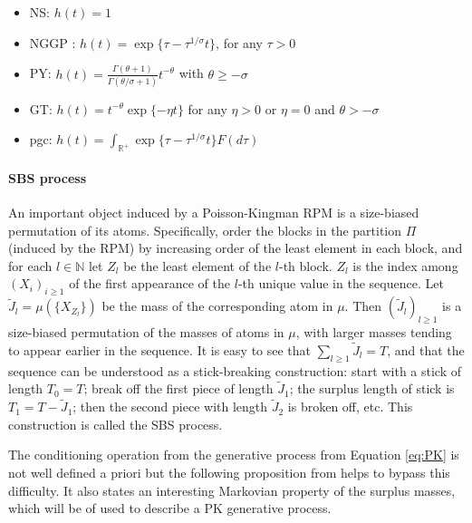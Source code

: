 \begin{itemize}
\item \acrfull{NS}: $h(t) = 1$
\item \acrfull{NGGP} : $h(t) = \exp\{\tau - \tau^{1/\sigma}t \}$, for any $\tau > 0$
\item \acrfull{PY}: $h(t) = \frac{\Gamma(\theta + 1)}{\Gamma(\theta / \sigma + 1)}t^{-\theta}$ with $\theta \ge -\sigma$
\item \acrfull{GT}: $h(t) = t^{-\theta} \exp\{-\eta t\}$ for any $\eta > 0$ or $\eta=0$ and $\theta>-\sigma$
\item \acrfull{pgc}: $h(t) = \int_{\mathbb{R}^+} \exp\{\tau - \tau^{1/\sigma}t \} F(d\tau)$ \\
\end{itemize}

\paragraph{\acrlong{SBS} process} \label{SBS}
An important object induced by a Poisson-Kingman \gls{RPM} is a size-biased permutation of its atoms. Specifically, order the blocks in the partition $\Pi$ (induced by the \gls{RPM}) by increasing order of the least element in each block, and for each $l \in \mathbb{N}$ let $Z_l$ be the least element of the $l$-th block. $Z_l$ is the index among $(X_i)_{i \ge 1}$ of the first appearance of the $l$-th unique value in the sequence.
Let $\tilde{J}_l = \mu(\{X_{Z_l}\})$ be the mass of the corresponding atom in $\mu$. Then $(\tilde{J}_l)_{l\ge 1}$ is a size-biased permutation of the masses of atoms in $\mu$, with larger masses tending to appear earlier in the sequence. It is easy to see that $\sum_{l \ge 1}{\tilde{J}_l} = T$, and that the sequence can be understood as a stick-breaking construction: start with a stick of length $T_0 = T$; break off the first piece of length $\tilde{J}_1$; the surplus length of stick is $T_1 = T - \tilde{J}_1$; then the second piece with length $\tilde{J}_2$ is broken off, etc. This construction is called the \acrfull{SBS} process.

The conditioning operation from the generative process from Equation \ref{eq:PK} is not well defined a priori but the following proposition from \cite{Perman:1992ke} helps to bypass this difficulty. It also states an interesting Markovian property of the surplus masses, which will be of used to describe a \gls{PK} generative process. \\

